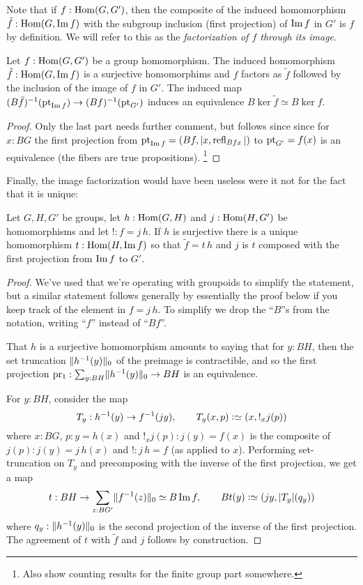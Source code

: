 Note that if $f:\Hom(G,G')$, then the composite of the induced homomorphism $\tilde f:\Hom(G,\image f)$ with the subgroup inclusion (first projection) of $\image f$ in $G'$ is $f$ by definition.  We will refer to this as the \emph{factorization of $f$ through its image}.

\begin{lemma}
  \label{lem:kerandcoker}
  \label{lem:countinggps}
  Let $f:\Hom(G,G')$ be a group homomorphism.  The induced homomorphism $\tilde f:\Hom(G,\image f)$ is a surjective homomorphims and $f$ factors as $\tilde f$ followed by the inclusion of the image of $f$ in $G'$.  The induced map $(B\tilde f)^{-1}(\pt_{\image f})\to (Bf)^{-1}(\pt_{G'})$ induces an equivalence $B\ker\tilde f\simeq B\ker f$.
\end{lemma}
\begin{proof}
Only the last part needs further comment, but follows since since for $x:BG$ the first projection from $\pt_{\image f}=(Bf,|x,\refl{Bfx}|)$ to $\mathrm{pt}_{G'}=f(x)$ is an equivalence (the fibers are true propositions).
  \footnote{\color{blue}  
 Also show counting results for the finite group part somewhere.} 
\end{proof}

Finally, the image factorization would have been useless were it not for the fact that it is unique:
\begin{lemma}
  \label{lem:uniquenessofimagefactorizationforgroups}
  Let $G,H,G'$ be groups, let $h:\Hom(G,H)$ and $j:\Hom(H,G')$ be homomorphisms and let $!:f=j\,h$.  If $h$ is surjective there is a unique homomorphism $t:\Hom(H,\image f)$ so that $\tilde f=t\, h$ and $j$ is $t$ composed with the first projection from $\image f$ to $ G'$.
\end{lemma}
\begin{proof}
  We've used that we're operating with groupoids to simplify the statement, but a similar statement follows generally by essentially the proof below if you keep track of the element in $f=j\,h$.  To simplify we drop the ``$B$''s from the notation, writing ``$f$'' instead of ``$Bf$''.  

That $h$ is a surjective homomorphism amounts to saying that for $y:BH$, then the set truncation $\lVert h^{-1}(y)\rVert_0$ of the preimage is contractible, and so the first projection $\mathrm{pr_1}:\sum_{y:BH}\lVert h^{-1}(y)\rVert_0\to BH$ is an equivalence.

For $y:BH$, consider the map 
$$T_y:h^{-1}(y)\to f^{-1}(j y),\qquad T_y(x,p)\defequi (x,!_xj(p))$$ where $x:BG$, $p:y=h(x)$ and $!_xj(p):j(y)=f(x)$ is the composite of $j(p):j(y)=j\,h(x)$ and $!:j\,h=f$ (as applied to $x$).  Performing set-truncation on $T_y$ and precomposing with the inverse of the first projection, we get a map
$$t:BH%
\to\sum_{z:BG'}\Trunc{f^{-1}(z)}_0\oldequiv B\image f,\qquad Bt(y)\defequi(jy,|T_y|(q_y))$$
where $q_y:\lVert h^{-1}(y)\rVert_0$ is the second projection of the inverse of the first projection.  The agreement of $t$ with $\tilde f$ and $j$ follows by construction.
\end{proof}

